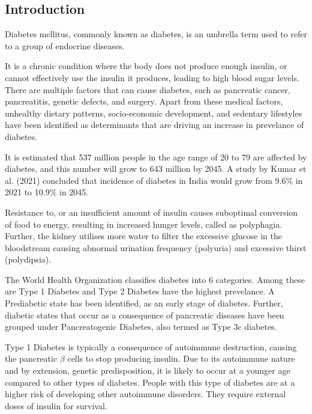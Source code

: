 \documentclass{article}
\begin{document}
\begin{multicols}{2}

\section{Introduction}

Diabetes mellitus, commonly known as diabetes, is an umbrella term used to refer to a group of endocrine diseases.

It is a chronic condition where the body does not produce enough insulin, or cannot effectively use the insulin it produces, leading to high blood sugar levels\cite{roglic2016global}.
There are multiple factors that can cause diabetes, such as pancreatic cancer, pancreatitis, genetic defects, and surgery.
Apart from these medical factors, unhealthy dietary patterns, socio-economic development, and sedentary lifestyles have been identified as determinants that are driving an increase in prevelance of diabetes\cite{caturano2023oxidative}.

It is estimated that 537 million people in the age range of 20 to 79 are affected by diabetes, and this number will grow to 643 million by 2045.
A study by Kumar et al. (2021) concluded that incidence of diabetes in India would grow from 9.6\% in 2021 to 10.9\% in 2045\cite{kumar2024prevalence}.

Resistance to, or an insufficient amount of insulin causes suboptimal conversion of food to energy, resulting in increased hunger levels, called as polyphagia.
Further, the kidney utilises more water to filter the excessive glucose in the bloodstream causing abnormal urination frequency (polyuria) and excessive thirst (polydipsia).

The World Health Organization classifies diabetes into 6 categories. Among these are Type 1 Diabetes and Type 2 Diabetes have the highest prevelance.
A Prediabetic state has been identified, as an early stage of diabetes.
Further, diabetic states that occur as a consequence of pancreatic diseases have been grouped under Pancreatogenic Diabetes, also termed as Type 3c diabetes.

Type 1 Diabetes is typically a consequence of autoimmune destruction, causing the pancreatic $\beta$ cells to stop producing insulin. 
Due to its autoimmune nature and by extension, genetic predisposition, it is likely to occur at a younger age compared to other types of diabetes.
People with this type of diabetes are at a higher risk of developing other autoimmune disorders. They require external doses of insulin for survival\cite{syed2022type}.


\end{multicols}
\end{document}
